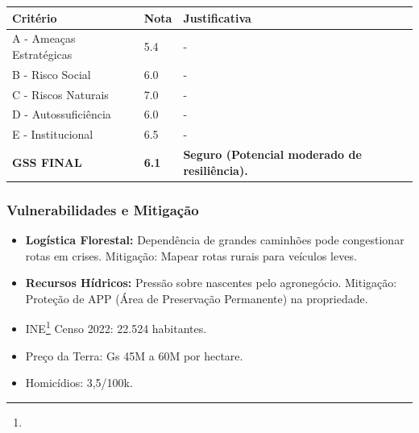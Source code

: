 \begin{table}[ht!]
\small \begin{tabular}{p{3.0cm}p{0.8cm}p{6.0cm}} \toprule
\textbf{Critério} & \textbf{Nota} & \textbf{Justificativa} \\ \midrule
A - Ameaças Estratégicas & 5.4 & - \\
B - Risco Social & 6.0 & - \\
C - Riscos Naturais & 7.0 & - \\
D - Autossuficiência & 6.0 & - \\
E - Institucional & 6.5 & - \\
\midrule \textbf{GSS FINAL} & \textbf{6.1} & \textbf{Seguro (Potencial moderado de resiliência).} \\ \bottomrule \end{tabular}
\end{table}
\subsubsection{Vulnerabilidades e
Mitigação}

\begin{itemize}
\item
  \textbf{Logística Florestal:} Dependência de grandes caminhões pode
  congestionar rotas em crises. Mitigação: Mapear rotas rurais para
  veículos leves.
\item
  \textbf{Recursos Hídricos:} Pressão sobre nascentes pelo agronegócio.
  Mitigação: Proteção de APP (Área de Preservação Permanente) na
  propriedade.
\item
  INE\footnote{\fineINE} Censo 2022: 22.524 habitantes.
\item
  Preço da Terra: Gs 45M a 60M por hectare.
\item
  Homicídios: 3,5/\allowbreak 100k.
\end{itemize}
